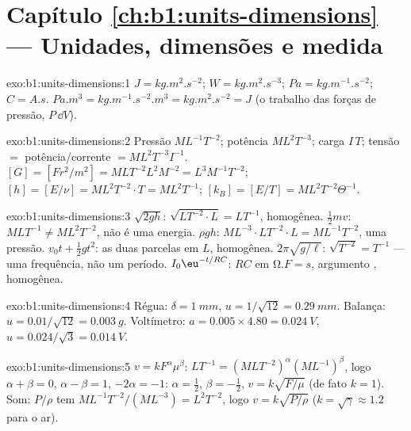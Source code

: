 \section*{Capítulo \ref{ch:b1:units-dimensions} --- Unidades, dimensões e medida}

\begin{solution}{exo:b1:units-dimensions:1}
$\unit{J} = \unit{kg.m^2.s^{-2}}$; $\unit{W} = \unit{kg.m^2.s^{-3}}$;
$\unit{Pa} = \unit{kg.m^{-1}.s^{-2}}$; $\unit{C} = \unit{A.s}$.
$\unit{Pa.m^3} = \unit{kg.m^{-1}.s^{-2}.m^3} = \unit{kg.m^2.s^{-2}} = \unit{J}$
(o trabalho das forças de pressão, $P\,\dd V$).
\end{solution}

\begin{solution}{exo:b1:units-dimensions:2}
Pressão $M L^{-1} T^{-2}$; potência $M L^2 T^{-3}$; carga $I\,T$;
tensão $= $ potência/corrente $= M L^2 T^{-3} I^{-1}$.
$[G] = [F r^2/m^2] = M L T^{-2} L^2 M^{-2} = L^3 M^{-1} T^{-2}$;
$[h] = [E/\nu] = M L^2 T^{-2} \cdot T = M L^2 T^{-1}$;
$[k_B] = [E/T] = M L^2 T^{-2} \Theta^{-1}$.
\end{solution}

\begin{solution}{exo:b1:units-dimensions:3}
$\sqrt{2gh}$: $\sqrt{L T^{-2} \cdot L} = L T^{-1}$, homogênea.
$\tfrac12 mv$: $M L T^{-1} \neq M L^2 T^{-2}$, não é uma energia.
$\rho g h$: $M L^{-3} \cdot L T^{-2} \cdot L = M L^{-1} T^{-2}$, uma pressão.
$v_0 t + \tfrac12 g t^2$: as duas parcelas em $L$, homogênea.
$2\pi\sqrt{g/\ell}$: $\sqrt{T^{-2}} = T^{-1}$ --- uma frequência, não um período.
$I_0\eu^{-t/RC}$: $RC$ em $\unit{\ohm.F} = \unit{s}$, argumento , homogênea.
\end{solution}

\begin{solution}{exo:b1:units-dimensions:4}
Régua: $\delta = \qty{1}{mm}$, $u = 1/\sqrt{12} = \qty{0.29}{mm}$.
Balança: $u = 0.01/\sqrt{12} = \qty{0.003}{g}$.
Voltímetro: $a = 0.005 \times 4.80 = \qty{0.024}{V}$,
$u = 0.024/\sqrt3 = \qty{0.014}{V}$.
\end{solution}

\begin{solution}{exo:b1:units-dimensions:5}
$v = k F^\alpha \mu^\beta$: $L T^{-1} = (M L T^{-2})^\alpha (M L^{-1})^\beta$,
logo $\alpha + \beta = 0$, $\alpha - \beta = 1$, $-2\alpha = -1$:
$\alpha = \tfrac12$, $\beta = -\tfrac12$, $v = k\sqrt{F/\mu}$ (de fato $k = 1$).
Som: $P/\rho$ tem  $M L^{-1} T^{-2} / (M L^{-3}) = L^2 T^{-2}$,
logo $v = k\sqrt{P/\rho}$ ($k = \sqrt\gamma \approx 1.2$ para o ar).
\end{solution}

